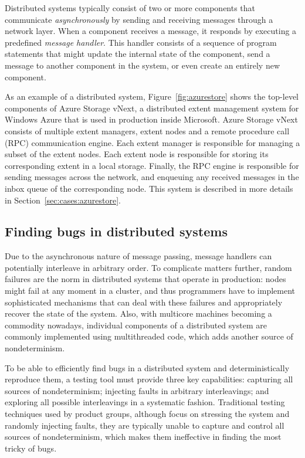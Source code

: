 Distributed systems typically consist of two or more components that communicate \emph{asynchronously} by sending and receiving messages through a network layer. When a component receives a message, it responds by executing a predefined \emph{message handler}. This handler consists of a sequence of program statements that might update the internal state of the component, send a message to another component in the system, or even create an entirely new component.

As an example of a distributed system, Figure~\ref{fig:azurestore} shows the top-level components of Azure Storage vNext, a distributed extent management system for Windows Azure that is used in production inside Microsoft. Azure Storage vNext consists of multiple extent managers, extent nodes and a remote procedure call (RPC) communication engine. Each extent manager is responsible for managing a subset of the extent nodes. Each extent node is responsible for storing its corresponding extent in a local storage. Finally, the RPC engine is responsible for sending messages across the network, and enqueuing any received messages in the inbox queue of the corresponding node. This system is described in more details in Section~\ref{sec:cases:azurestore}.

\subsection{Finding bugs in distributed systems}
\label{sec:overview:bugs}

Due to the asynchronous nature of message passing, message handlers can potentially interleave in arbitrary order. To complicate matters further, random failures are the norm in distributed systems that operate in production: nodes might fail at any moment in a cluster, and thus programmers have to implement sophisticated mechanisms that can deal with these failures and appropriately recover the state of the system. Also, with multicore machines becoming a commodity nowadays, individual components of a distributed system are commonly implemented using multithreaded code, which adds another source of nondeterminism.

To be able to efficiently find bugs in a distributed system and deterministically reproduce them, a testing tool must provide three key capabilities: capturing all sources of nondeterminism; injecting faults in arbitrary interleavings; and exploring all possible interleavings in a systematic fashion. Traditional testing techniques used by product groups, although focus on stressing the system and randomly injecting faults, they are typically unable to capture and control all sources of nondeterminism, which makes them ineffective in finding the most tricky of bugs.

